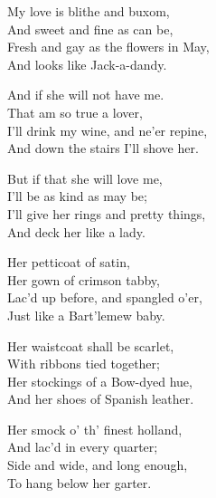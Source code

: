 \pagebreak

\smallskip


\settowidth{\versewidth}{Fresh and gay as the flowers in May,}
\begin{dcverse}\begin{altverse}
My love is blithe and buxom,\\
And sweet and fine as can be,\\
Fresh and gay as the flowers in May,\\
And looks like Jack-a-dandy.
\end{altverse}

\begin{altverse}
And if she will not have me.\\
That am so true a lover,\\
I’ll drink my wine, and ne’er repine,\\
And down the stairs I’ll shove her.
\end{altverse}

\begin{altverse}
But if that she will love me,\\
I’ll be as kind as may be;\\
I’ll give her rings and pretty things,\\
And deck her like a lady.
\end{altverse}

\begin{altverse}
Her petticoat of satin,\\
Her gown of crimson tabby,\\
Lac’d up before, and spangled o’er,\\
Just like a Bart’lemew baby.
\end{altverse}

\begin{altverse}
Her waistcoat shall be scarlet,\\
With ribbons tied together;\\
Her stockings of a Bow-dyed hue,\\
And her shoes of Spanish leather.
\end{altverse}

\begin{altverse}
Her smock o’ th’ finest holland,\\
And lac’d in every quarter;\\
Side and wide, and long enough,\\
To hang below her garter.
\end{altverse}


\end{dcverse}
